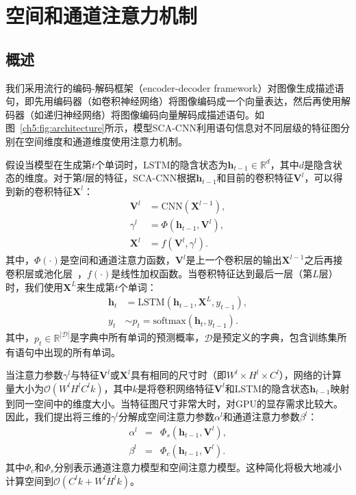 \section{空间和通道注意力机制}

\subsection{概述}
我们采用流行的编码-解码框架（encoder-decoder framework）对图像生成描述语句，即先用编码器（如卷积神经网络）将图像编码成一个向量表达，然后再使用解码器（如递归神经网络）将图像编码向量解码成描述语句。如图~\ref{ch5:fig:architecture}所示，模型SCA-CNN利用语句信息对不同层级的特征图分别在空间维度和通道维度使用注意力机制。

假设当模型在生成第$t$个单词时，LSTM的隐含状态为$\bm{h}_{t-1}\in\mathbb{R}^d$，其中$d$是隐含状态的维度。对于第$l$层的特征，SCA-CNN根据$\bm{h}_{t-1}$和目前的卷积特征$\bm{V}^l$，可以得到新的卷积特征$\bm{X}^l$：
\begin{equation} \label{ch5:eq:eq_1}
\begin{split}
\bm{V}^l &= \textrm{CNN}\left(\bm{X}^{l-1}\right),\\
\gamma^l &= \Phi\left(\bm{h}_{t-1},\bm{V}^l\right),\\
\bm{X}^l &= f\left(\bm{V}^{l},\gamma^{l}\right).
\end{split}
\end{equation}
其中，$\Phi(\cdot)$是空间和通道注意力函数，$\bm{V}^l$是上一个卷积层的输出$\bm{X}^{l-1}$之后再接卷积层或池化层~\cite{simonyan2015very,he2016deep}，$f(\cdot)$是线性加权函数。当卷积特征达到最后一层（第$L$层）时，我们使用$\bm{X}^L$来生成第$t$个单词：
\begin{equation}
\begin{split}
\bm{h}_t &= \textrm{LSTM}\left(\bm{h}_{t-1},\bm{X}^L,y_{t-1}\right),\\
y_t & \sim p_t = \textrm{softmax} \left(\bm{h}_t, y_{t-1} \right).
\end{split}
\end{equation}
其中，$p_t \in \mathbb{R}^{|\mathcal{D}|}$是字典中所有单词的预测概率，$\mathcal{D}$是预定义的字典，包含训练集所有语句中出现的所有单词。

当注意力参数$\gamma^l$与特征$\bm{V}^l$或$\bm{X}^l$具有相同的尺寸时（即$W^l\times H^l\times C^l$），网络的计算量大小为$\mathcal{O}(W^lH^lC^lk)$，其中$k$是将卷积网络特征$\bm{V}^l$和LSTM的隐含状态$\bm{h}_{t-1}$映射到同一空间中的维度大小。当特征图尺寸非常大时，对GPU的显存需求比较大。因此，我们提出将三维的$\gamma^l$分解成空间注意力参数$\alpha^l$和通道注意力参数$\beta^l$：
\begin{eqnarray}
\alpha^l &= & \Phi_s \left(\bm{h}_{t-1},\bm{V}^l\right),  \label{ch5:eq:eq_3} \\
\beta^l &= & \Phi_c \left(\bm{h}_{t-1},\bm{V}^l\right). \label{ch5:eq:eq_4}
\end{eqnarray}
其中$\Phi_c$和$\Phi_s$分别表示通道注意力模型和空间注意力模型。这种简化将极大地减小计算空间到$\mathcal{O}(C^lk+W^lH^lk)$。

